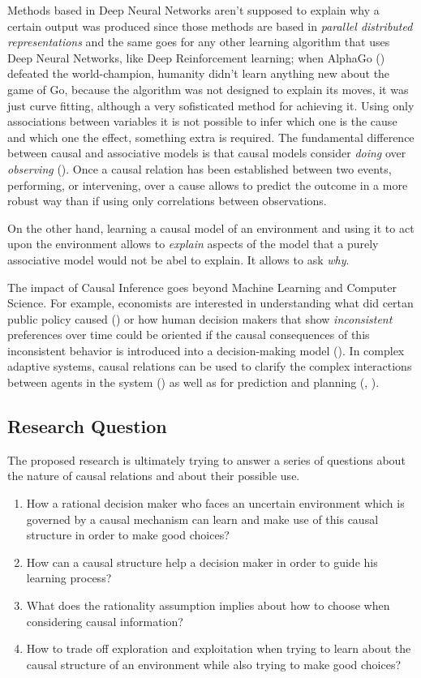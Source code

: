 \documentclass[english,letterpaper,12pt,final]{article}
\theoremstyle{definition}
\begin{document}
	Methods based in Deep Neural Networks aren't supposed to explain why a certain output was produced since those methods are based in \textit{parallel distributed representations} and the same goes for any other learning algorithm that uses Deep Neural Networks, like Deep Reinforcement learning; when AlphaGo (\cite{silver2017mastering}) defeated the world-champion, humanity didn't learn anything new about the game of Go, because the algorithm was not designed to explain its moves, it was just curve fitting, although a very sofisticated method for achieving it. Using only associations between variables it is not possible to infer which one is the cause and which one the effect, something extra is required. The fundamental difference between causal and associative models is that causal models consider \textit{doing} over \textit{observing} (\cite{pearl2018why}). Once a causal relation has been established between two events, performing, or intervening, over a cause allows to predict the outcome in a more robust way than if using only correlations between observations. 
	
	On the other hand, learning a causal model of an environment and using it to act upon the environment allows to \textit{explain} aspects of the model that a purely associative model would not be abel to explain. It allows to ask \textit{why}.
	
	The impact of Causal Inference goes beyond Machine Learning and Computer Science. For example, economists are interested in understanding what did certan public policy caused (\cite{athey2017impact}) or how human decision makers that show \textit{inconsistent} preferences over time could be oriented if the causal consequences of this inconsistent behavior is introduced into a decision-making model (\cite{albers2016motivating}). In complex adaptive systems, causal relations can be used to clarify the complex interactions between agents in the system (\cite{abbott2017complex}) as well as for prediction and planning (\cite{hunt2016ants}, \cite{brock2018causality}).
	
	\subsection{Research Question}
The proposed research is ultimately trying to answer a series of questions about the nature of causal relations and about their possible use.
\begin{enumerate}
\item How a rational decision maker who faces an uncertain environment which is governed by a causal mechanism can learn and make use of this causal structure in order to make good choices? \item How can a causal structure help a decision maker in order to guide his learning process? 
\item What does the rationality assumption implies about how to choose when considering causal information? 
\item How to trade off exploration and exploitation when trying to learn about the causal structure of an environment while also trying to make good choices?
\end{enumerate}
\end{document}
